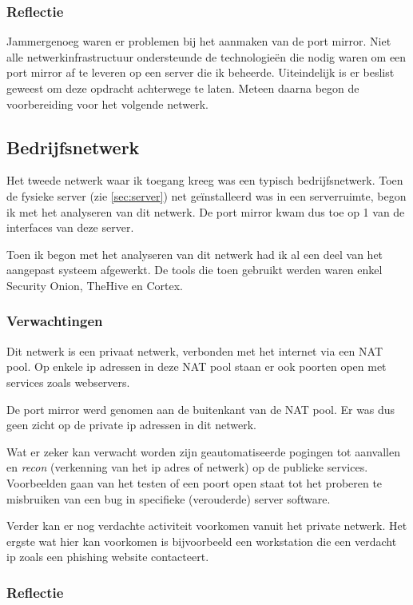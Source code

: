 \documentclass[a4paper,12pt]{report}
\begin{document}
\subsubsection{Reflectie}
Jammergenoeg waren er problemen bij het aanmaken van de port mirror.
Niet alle netwerkinfrastructuur ondersteunde de technologieën die nodig waren om een port mirror af te leveren op een server die ik beheerde.
Uiteindelijk is er beslist geweest om deze opdracht achterwege te laten.
Meteen daarna begon de voorbereiding voor het volgende netwerk.

\subsection{Bedrijfsnetwerk}
\label{sec:bedrijfsnetwerk}
Het tweede netwerk waar ik toegang kreeg was een typisch bedrijfsnetwerk.
Toen de fysieke server (zie \ref{sec:server}) net geïnstalleerd was in een serverruimte, begon ik met het analyseren van dit netwerk.
De port mirror kwam dus toe op 1 van de interfaces van deze server.

Toen ik begon met het analyseren van dit netwerk had ik al een deel van het aangepast systeem afgewerkt.
De tools die toen gebruikt werden waren enkel Security Onion, TheHive en Cortex.

\subsubsection{Verwachtingen}
Dit netwerk is een privaat netwerk, verbonden met het internet via een NAT pool.
Op enkele ip adressen in deze NAT pool staan er ook poorten open met services zoals webservers.

De port mirror werd genomen aan de buitenkant van de NAT pool.
Er was dus geen zicht op de private ip adressen in dit netwerk.

Wat er zeker kan verwacht worden zijn geautomatiseerde pogingen tot aanvallen en \emph{recon} (verkenning van het ip adres of netwerk) op de publieke services.
Voorbeelden gaan van het testen of een poort open staat tot het proberen te misbruiken van een bug in specifieke (verouderde) server software.

Verder kan er nog verdachte activiteit voorkomen vanuit het private netwerk.
Het ergste wat hier kan voorkomen is bijvoorbeeld een workstation die een verdacht ip zoals een phishing website contacteert.


\subsubsection{Reflectie}
\end{document}
